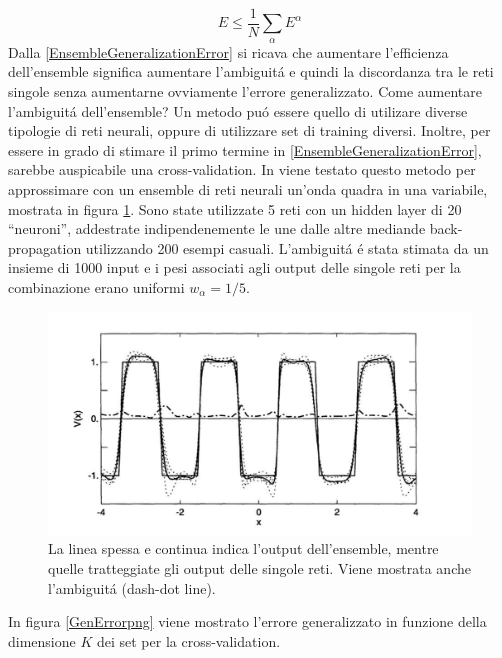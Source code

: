 \documentclass[a4paper,10pt]{article}
\begin{document}
  \begin{equation}
   E \le \frac{1}{N} \sum_{\alpha} E^{\alpha}
  \end{equation}
  Dalla \ref{EnsembleGeneralizationError} si ricava che aumentare l'efficienza dell'ensemble significa aumentare l'ambiguit\'a e quindi la discordanza tra le reti singole senza aumentarne ovviamente l'errore generalizzato. Come aumentare l'ambiguit\'a dell'ensemble? Un metodo pu\'o essere quello di utilizare diverse tipologie di reti neurali, oppure di utilizzare set di training diversi. Inoltre, per essere in grado di stimare il primo termine in \ref{EnsembleGeneralizationError}, sarebbe auspicabile una cross-validation. In \cite{krogh1995neural} viene testato questo metodo per approssimare con un ensemble di reti neurali un'onda quadra in una variabile, mostrata in figura \ref{SqWavepng}. Sono state utilizzate 5 reti con un hidden layer di 20 ``neuroni'', addestrate indipendenemente le une dalle altre mediande back-propagation utilizzando 200 esempi casuali. L'ambiguit\'a \'e stata stimata da un insieme di 1000 input e i pesi associati agli output delle singole reti per la combinazione erano uniformi $w_{\alpha} = 1/5$.
  \begin{figure}[h!]
   \centering
   \includegraphics[scale=0.4]{SqWave.png}
   \caption{La linea spessa e continua indica l'output dell'ensemble, mentre quelle tratteggiate gli output delle singole reti. Viene mostrata anche l'ambiguit\'a (dash-dot line).}
   \label{SqWavepng}
  \end{figure}
  In figura \ref{GenErrorpng} viene mostrato l'errore generalizzato in funzione della dimensione $K$ dei set per la cross-validation.
\end{document}
